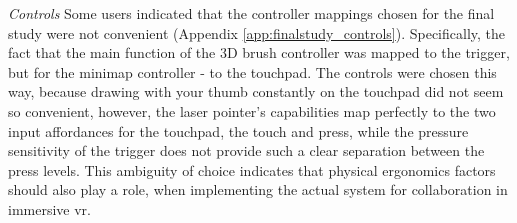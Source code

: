 \textit{Controls} Some users indicated that the controller mappings chosen for the final study were not convenient (Appendix \ref{app:finalstudy_controls}). Specifically, the fact that the main function of the 3D brush controller was mapped to the trigger, but for the minimap controller - to the touchpad. The controls were chosen this way, because drawing with your thumb constantly on the touchpad did not seem so convenient, however, the laser pointer's capabilities map perfectly to the two input affordances for the touchpad, the touch and press, while the pressure sensitivity of the trigger does not provide such a clear separation between the press levels. This ambiguity of choice indicates that physical ergonomics factors should also play a role, when implementing the actual system for collaboration in immersive \gls{vr}.